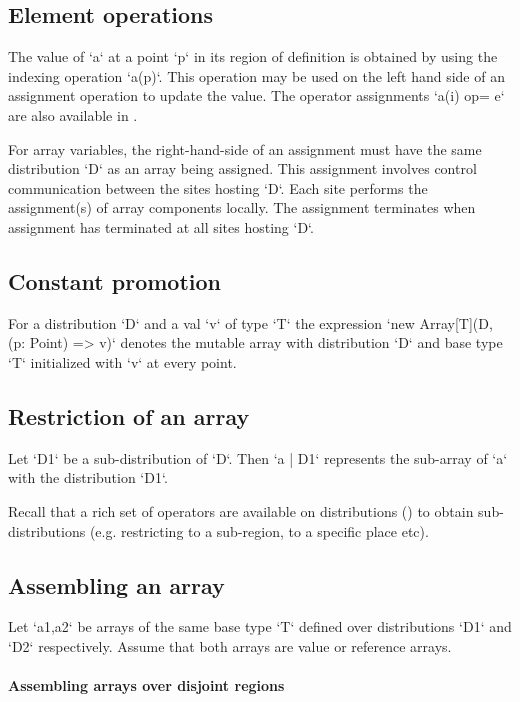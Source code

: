 {\subsection{Element operations}
The value of \xcd`a` at a point \xcd`p` in its region of definition is
obtained by using the indexing operation \xcd`a(p)`. This operation
may be used on the left hand side of an assignment operation to update
the value. The operator assignments \xcd`a(i) op= e` are also available
in \Xten{}.

For array variables, the right-hand-side of an assignment must
have the same distribution \xcd`D` as an array being assigned. This
assignment involves
control communication between the sites hosting \xcd`D`. Each
site performs the assignment(s) of array components locally. The
assignment terminates when assignment has terminated at all
sites hosting \xcd`D`.

\subsection{Constant promotion}\label{ConstantArray}

For a distribution \xcd`D` and a val \xcd`v` of
type \xcd`T` the expression \xcd`new Array[T](D, (p: Point) => v)`
denotes the mutable array with
distribution \xcd`D` and base type \xcd`T` initialized with \xcd`v`
at every point.

\subsection{Restriction of an array}

Let \xcd`D1` be a sub-distribution of \xcd`D`. Then \xcd`a | D1`
represents the sub-array of \xcd`a` with the distribution \xcd`D1`.

Recall that a rich set of operators are available on distributions
() to obtain sub-distributions
(e.g. restricting to a sub-region, to a specific place etc).

\subsection{Assembling an array}
Let \xcd`a1,a2` be arrays of the same base type \xcd`T` defined over
distributions \xcd`D1` and \xcd`D2` respectively. Assume that both
arrays are value or reference arrays. 
\paragraph{Assembling arrays over disjoint regions}

}
